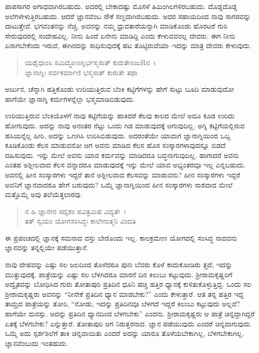 ಪಾಪಸಾಗರ ಅಗಾಧವಾಗಿರಬಹುದು. ಅದರಲ್ಲಿ ಬೇಕಾದಷ್ಟು ಮೊಸಳೆ ತಿಮಿಂಗಿಲಗಳಿರಬಹುದು. ದೊಡ್ಡದೊಡ್ಡ ಅಲೆಗಳೇಳುತ್ತಿರಬಹುದು. ಆದರೆ ಜ್ಞಾನವೆಂಬ ನೌಕೆ ಸಣ್ಣದಾಗಿರಬಹುದು. ಅದರ ಸಹಾಯದಿಂದ ನಾವು ಸಾಗರವನ್ನು ದಾಟುತ್ತೇವೆ. ಭಗವಂತನನ್ನು ನೆಚ್ಚಿ, ಅವನನ್ನು ನಮ್ಮ ಧ್ರುವತಾರೆಯನ್ನಾಗಿ ಮಾಡಿಕೊಂಡು ಹೊರಟರೆ ಗುರಿ ಸೇರುವುದರಲ್ಲಿ ಸಂದೇಹವಿಲ್ಲ. ನೀನು ಹಿಂದೆ ಏನೇನು ಮಾಡಿದ್ದಿ ಎಂದು ಕೇಳುವವನಲ್ಲ ದೇವರು. ಈಗ ನೀನು ಏನಾಗಬೇಕೆಂದು ಇರುವೆ, ಈಗಿನದನ್ನು ಸಾಧಿಸುವುದಕ್ಕೆ ಹಟ ತೊಟ್ಟಿರುವೆಯಾ–ಇದನ್ನು ಮಾತ್ರ ದೇವರು ಕೇಳುವುದು.

\begin{verse}
ಯಥೈಧಾಂಸಿ ಸಮಿದ್ಧೋಽಗ್ನಿರ್ಭಸ್ಮಸಾತ್ ಕುರುತೇಽಜುRನ~।\\ಜ್ಞಾನಾಗ್ನಿಃ ಸರ್ವಕರ್ಮಾಣಿ ಭಸ್ಮಸಾತ್ ಕುರುತೇ ತಥಾ 
\end{verse}

{\small ಅರ್ಜುನ, ಚೆನ್ನಾಗಿ ಹತ್ತಿಕೊಂಡು ಉರಿಯುತ್ತಿರುವ ಬೆಂಕಿ ಕಟ್ಟಿಗೆಗಳನ್ನು ಹೇಗೆ ಸುಟ್ಟು ಬೂದಿ ಮಾಡುವುದೋ ಹಾಗೆಯೇ ಜ್ಞಾನಾಗ್ನಿ ಕರ್ಮಗಳನ್ನೆಲ್ಲಾ ಭಸ್ಮಮಾಡಿಬಿಡುವುದು.}

ಉರಿಯುತ್ತಿರುವ ಬೆಂಕಿಯೊಳಗೆ ನಾವು ಕಟ್ಟಿಗೆಯನ್ನು ಹಾಕಿದರೆ ಕೆಲವು ಕಾಲದ ಮೇಲೆ ಅದೂ ಕೂಡ ಉರಿದು ಹೋಗುವುದು. ಅದನ್ನು ನಾವು ಅನಂತರ ನೆಟ್ಟು ಒಂದು ಗಿಡ ಮಾಡುವುದಕ್ಕೆ ಆಗುವುದಿಲ್ಲ. ಅಗ್ನಿ ಕಟ್ಟಿಗೆಯಲ್ಲಿರುವ ಹಸಿಯನ್ನೆಲ್ಲ ಹೀರಿ, ಅದನ್ನು ಒಣಗಿಸಿ ಉರಿಸಿಬಿಡುವುದು. ಅದರಂತೆಯೇ ಯಾವಾಗ ಜ್ಞಾನಾಗ್ನಿಯಿಂದ ಒಬ್ಬ ಕೂಡಿಕೊಂಡು ಕೆಲಸ ಮಾಡುವನೋ ಆಗ ಅವನು ಮಾಡಿದ ಕೆಲಸ ಹೊಸ ಸಂಸ್ಕಾರಗಳಾವುದನ್ನೂ ಬಿಡದೆ ದಹಿಸುವುದು. ಇನ್ನು ಮೇಲೆ ಅವನು ಯಾವ ಕರ್ಮವನ್ನು ಮಾಡಿದರೂ ಬದ್ಧನಾಗುವುದಿಲ್ಲ. ಹಾಗಾದರೆ ಅವನು ಎಂತಹ ಅಶ್ಲೀಲವಾದ ಕೆಲಸ ವನ್ನಾದರೂ ಮಾಡುವುದಕ್ಕೆ ಇನ್ನು ಮೇಲೆ ಯಾವ ಅಭ್ಯಂತರವೂ ಇಲ್ಲ ಎನ್ನಬಹುದು. ಅವನಲ್ಲಿ ಹೀನ ಸಂಸ್ಕಾರಗಳು ಇದ್ದರೆ ತಾನೆ ಅಶ್ಲೀಲವಾದ ಕೆಲಸವನ್ನು ಮಾಡುವನು? ಹೀನ ಸಂಸ್ಕಾರಗಳು ಇದ್ದರೆ ಅವನಿಗೆ ಜ್ಞಾನವಾದರೂ ಹೇಗೆ ಬರುವುದು? ಒಮ್ಮೆ ಜ್ಞಾನಾಗ್ನಿಯಿಂದ ಹೀನ ಸಂಸ್ಕಾರಗಳು ನಾಶವಾದ ಮೇಲೆ ಮತ್ತೊಮ್ಮೆ ಅವು ತಲೆಯೆತ್ತಲಾರವು.

\begin{verse}
ನ ಹಿ ಜ್ಞಾನೇನ ಸದೃಶಂ ಪವಿತ್ರಮಿಹ ವಿದ್ಯತೇ~।\\ತತ್ ಸ್ವಯಂ ಯೋಗಸಂಸಿದ್ಧಃ ಕಾಲೇನಾತ್ಮನಿ ವಿಂದತಿ 
\end{verse}

{\small ಈ ಪ್ರಪಂಚದಲ್ಲಿ ಜ್ಞಾನಕ್ಕೆ ಸಮನಾದ ವಸ್ತು ಬೇರೊಂದು ಇಲ್ಲ. ಕಾಲಕ್ರಮೇಣ ಯೋಗದಲ್ಲಿ ಸಂಸಿದ್ಧ ನಾದವನು ಜ್ಞಾನವನ್ನು ತನ್ನಲ್ಲಿಯೇ ಪಡೆಯುತ್ತಾನೆ.}

ನಾವು ದೇಹವನ್ನು ಎಷ್ಟು ಸಲ ಜಲದಿಂದ ತೊಳೆದರೂ ಪುನಃ ಬೆವರು ಕೊಳೆ ಕಾದುಕೊಂಡಿರು ತ್ತದೆ, ಇದನ್ನು ಮುತ್ತುವುದಕ್ಕೆ. ಪಾತ್ರೆಯನ್ನು ಎಷ್ಟು ಸಲ ಬೆಳಗಿದರೂ ಮಾರನೆ ದಿನ ಕಿಲುಬು ಕಟ್ಟುವುದು. ಶ‍್ರೀರಾಮಕೃಷ್ಣರಿಗೆ ಅದ್ವೈತವನ್ನು ಬೋಧಿಸಿದ ಗುರು ತೋತಾಪುರಿ ಪ್ರತಿದಿನ ಧೂನಿ ಹಚ್ಚಿ ಹತ್ತಿರ ಧ್ಯಾನಕ್ಕೆ ಕುಳಿತುಕೊಳ್ಳುತ್ತಿದ್ದ. ಒಂದು ಸಲ ಶ‍್ರೀರಾಮಕೃಷ್ಣರು ಅವನನ್ನು “ನೀನೇಕೆ ಪ್ರತಿದಿನ ಧ್ಯಾನ ಮಾಡಬೇಕು?” ಎಂದು ಕೇಳುತ್ತಾರೆ. ಆತ ತನ್ನ ಹತ್ತಿರ ಇದ್ದ ತಾಮ್ರದ ಪಾತ್ರೆಯನ್ನು ತೋರಿ, “ನೋಡು, ಇದನ್ನು ಪ್ರತಿದಿನವೂ ಬೆಳಗದೆ ಇದ್ದರೆ ಕಿಲುಬು ಕಟ್ಟುವುದು ಅಲ್ಲವೆ? ಹಾಗೆಯೇ ಮನಸ್ಸು. ಅದನ್ನು ಪ್ರತಿದಿನ ಧ್ಯಾನದಿಂದ ಬೆಳಗಬೇಕು” ಎಂದನು. ಶ‍್ರೀರಾಮಕೃಷ್ಣರು ಆ ಪಾತ್ರೆ ಚಿನ್ನದ್ದಾಗಿದ್ದರೆ ಏತಕ್ಕೆ ಬೆಳಗಬೇಕು? ಎನ್ನುತ್ತಾರೆ. ತೋತಾಪುರಿ ಆಗ ನಿರುತ್ತರನಾದ. ಜ್ಞಾನ ಪಡೆಯುವುದು ಎಂದರೆ ಚಿನ್ನವಾಗುವುದು. ಒಮ್ಮೆ ಅದು ಸ್ಪರ್ಶಶಿಲೆಗೆ ತಾಕಿ ಚಿನ್ನವಾಯಿತು ಎಂದರೆ ಅದನ್ನು ಯಾರೂ ತೊಳೆಯಬೇಕಾಗಿಲ್ಲ, ಬೆಳಗಬೇಕಾಗಿಲ್ಲ. ಜ್ಞಾನವೆಂಬುದು ಇಂತಹುದು.

